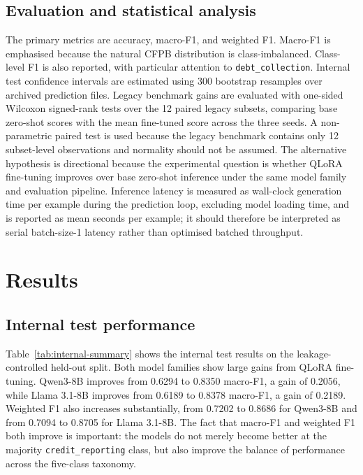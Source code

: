 \documentclass{elektr}
\begin{document}
\subsection{Evaluation and statistical analysis}

The primary metrics are accuracy, macro-F1, and weighted F1. Macro-F1 is emphasised because the natural CFPB distribution is class-imbalanced. Class-level F1 is also reported, with particular attention to \texttt{debt\_collection}. Internal test confidence intervals are estimated using 300 bootstrap resamples over archived prediction files. Legacy benchmark gains are evaluated with one-sided Wilcoxon signed-rank tests over the 12 paired legacy subsets, comparing base zero-shot scores with the mean fine-tuned score across the three seeds. A non-parametric paired test is used because the legacy benchmark contains only 12 subset-level observations and normality should not be assumed. The alternative hypothesis is directional because the experimental question is whether QLoRA fine-tuning improves over base zero-shot inference under the same model family and evaluation pipeline. Inference latency is measured as wall-clock generation time per example during the prediction loop, excluding model loading time, and is reported as mean seconds per example; it should therefore be interpreted as serial batch-size-1 latency rather than optimised batched throughput.

\section{Results}

\subsection{Internal test performance}

Table~\ref{tab:internal-summary} shows the internal test results on the leakage-controlled held-out split. Both model families show large gains from QLoRA fine-tuning. Qwen3-8B improves from 0.6294 to 0.8350 macro-F1, a gain of 0.2056, while Llama 3.1-8B improves from 0.6189 to 0.8378 macro-F1, a gain of 0.2189. Weighted F1 also increases substantially, from 0.7202 to 0.8686 for Qwen3-8B and from 0.7094 to 0.8705 for Llama 3.1-8B. The fact that macro-F1 and weighted F1 both improve is important: the models do not merely become better at the majority \texttt{credit\_reporting} class, but also improve the balance of performance across the five-class taxonomy.
\end{document}
